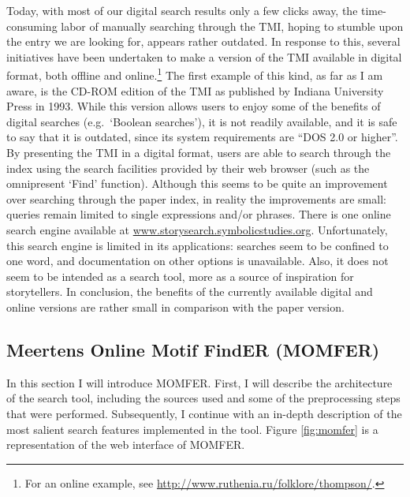 Today, with most of our digital search results only a few clicks away, the time-consuming labor of manually searching through the TMI, hoping to stumble upon the entry we are looking for, appears rather outdated. In response to this, several initiatives have been undertaken to make a version of the TMI available in digital format, both offline and online.\footnote{For an online example, see \url{http://www.ruthenia.ru/folklore/thompson/}.} The first example of this kind, as far as I am aware, is the CD-ROM edition of the TMI as published by Indiana University Press in 1993\autocite{thompson:1993}. While this version allows users to enjoy some of the benefits of digital searches (e.g.\ `Boolean searches'), it is not readily available, and it is safe to say that it is outdated, since its system requirements are ``DOS 2.0 or higher''\autocite[Unfortunately, I was unable to acquire a copy of this edition, which is why I have to refrain from a more detailed comparison. However, the fact that no research institution or university library in the Netherlands has a copy available is a case in point. I base myself on a review of this digital edition by][]{smith:1994}. By presenting the TMI in a digital format, users are able to search through the index using the search facilities provided by their web browser (such as the omnipresent `Find' function). Although this seems to be quite an improvement over searching through the paper index, in reality the improvements are small: queries remain limited to single expressions and/or phrases. There is one online search engine available at \url{www.storysearch.symbolicstudies.org}. Unfortunately, this search engine is limited in its applications: searches seem to be confined to one word, and documentation on other options is unavailable. Also, it does not seem to be intended as a search tool, more as a source of inspiration for storytellers. In conclusion, the benefits of the currently available digital and online versions are rather small in comparison with the paper version.

\subsection{Meertens Online Motif FindER (MOMFER)}\label{sec:momfer-production}

In this section I will introduce MOMFER. First, I will describe the architecture of the search tool, including the sources used and some of the preprocessing steps that were performed. Subsequently, I continue with an in-depth description of the most salient search features implemented in the tool. Figure \ref{fig:momfer} is a representation of the web interface of MOMFER.

